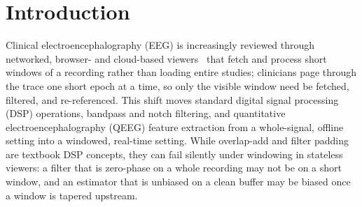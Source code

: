 \documentclass[conference]{IEEEtranSPMB}
\begin{document}
\section{Introduction}
Clinical electroencephalography (EEG) is increasingly reviewed through networked, browser- and
cloud-based viewers~\cite{weiler2023robin,currey2023epviz} that fetch and process short windows of
a recording rather than loading entire studies; clinicians page through the trace one short epoch
at a time, so only the visible window need be fetched, filtered, and re-referenced.
This shift moves standard digital signal processing (DSP) operations, bandpass and notch
filtering, and quantitative electroencephalography (QEEG) feature extraction from a whole-signal,
offline setting
into a windowed, real-time setting. While overlap-add and filter padding are textbook DSP concepts, they can fail silently under windowing in stateless viewers: a filter that is zero-phase on a whole recording may
not be on a short window, and an estimator that is unbiased on a clean buffer may be biased once
a window is tapered upstream.
\end{document}
